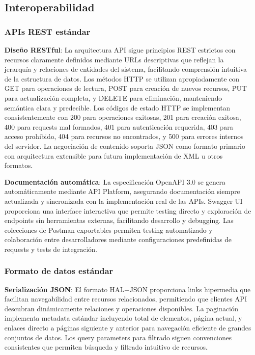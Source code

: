 \documentclass[12pt,a4paper,oneside]{report}
\begin{document}
\subsection{Interoperabilidad}\label{interoperabilidad}

\subsubsection{APIs REST estándar}\label{apis-rest-estuxe1ndar}

\textbf{Diseño RESTful}: La arquitectura API sigue principios REST estrictos con recursos claramente definidos mediante URLs descriptivas que reflejan la jerarquía y relaciones de entidades del sistema, facilitando comprensión intuitiva de la estructura de datos. Los métodos HTTP se utilizan apropiadamente con GET para operaciones de lectura, POST para creación de nuevos recursos, PUT para actualización completa, y DELETE para eliminación, manteniendo semántica clara y predecible. Los códigos de estado HTTP se implementan consistentemente con 200 para operaciones exitosas, 201 para creación exitosa, 400 para requests mal formados, 401 para autenticación requerida, 403 para acceso prohibido, 404 para recursos no encontrados, y 500 para errores internos del servidor. La negociación de contenido soporta JSON como formato primario con arquitectura extensible para futura implementación de XML u otros formatos.

\textbf{Documentación automática}: La especificación OpenAPI 3.0 se genera automáticamente mediante API Platform, asegurando documentación siempre actualizada y sincronizada con la implementación real de las APIs. Swagger UI proporciona una interface interactiva que permite testing directo y exploración de endpoints sin herramientas externas, facilitando desarrollo y debugging. Las colecciones de Postman exportables permiten testing automatizado y colaboración entre desarrolladores mediante configuraciones predefinidas de requests y tests de integración.

\subsubsection{Formato de datos
estándar}\label{formato-de-datos-estuxe1ndar}

\textbf{Serialización JSON}: El formato HAL+JSON proporciona links hipermedia que facilitan navegabilidad entre recursos relacionados, permitiendo que clientes API descubran dinámicamente relaciones y operaciones disponibles. La paginación implementa metadata estándar incluyendo total de elementos, página actual, y enlaces directo a páginas siguiente y anterior para navegación eficiente de grandes conjuntos de datos. Los query parameters para filtrado siguen convenciones consistentes que permiten búsqueda y filtrado intuitivo de recursos.
\end{document}
